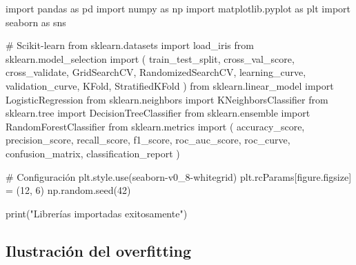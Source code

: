 \documentclass[
  doc,
  floatsintext,
  longtable,
  a4paper,
  nolmodern,
  notxfonts,
  notimes,
  12pt,
  colorlinks=true,linkcolor=blue,citecolor=blue,urlcolor=blue]{apa7}
\newenvironment{Shaded}{\begin{snugshade}}{\end{snugshade}}
\newcommand{\BuiltInTok}[1]{\textcolor[rgb]{0.00,0.23,0.31}{#1}}
\newcommand{\CommentTok}[1]{\textcolor[rgb]{0.37,0.37,0.37}{#1}}
\newcommand{\DecValTok}[1]{\textcolor[rgb]{0.68,0.00,0.00}{#1}}
\newcommand{\ImportTok}[1]{\textcolor[rgb]{0.00,0.46,0.62}{#1}}
\newcommand{\NormalTok}[1]{\textcolor[rgb]{0.00,0.23,0.31}{#1}}
\newcommand{\OperatorTok}[1]{\textcolor[rgb]{0.37,0.37,0.37}{#1}}
\newcommand{\StringTok}[1]{\textcolor[rgb]{0.13,0.47,0.30}{#1}}
\begin{document}
\begin{Shaded}
\begin{Highlighting}[]
\ImportTok{import}\NormalTok{ pandas }\ImportTok{as}\NormalTok{ pd}
\ImportTok{import}\NormalTok{ numpy }\ImportTok{as}\NormalTok{ np}
\ImportTok{import}\NormalTok{ matplotlib.pyplot }\ImportTok{as}\NormalTok{ plt}
\ImportTok{import}\NormalTok{ seaborn }\ImportTok{as}\NormalTok{ sns}

\CommentTok{\# Scikit{-}learn}
\ImportTok{from}\NormalTok{ sklearn.datasets }\ImportTok{import}\NormalTok{ load\_iris}
\ImportTok{from}\NormalTok{ sklearn.model\_selection }\ImportTok{import}\NormalTok{ (}
\NormalTok{    train\_test\_split, cross\_val\_score, cross\_validate,}
\NormalTok{    GridSearchCV, RandomizedSearchCV, learning\_curve,}
\NormalTok{    validation\_curve, KFold, StratifiedKFold}
\NormalTok{)}
\ImportTok{from}\NormalTok{ sklearn.linear\_model }\ImportTok{import}\NormalTok{ LogisticRegression}
\ImportTok{from}\NormalTok{ sklearn.neighbors }\ImportTok{import}\NormalTok{ KNeighborsClassifier}
\ImportTok{from}\NormalTok{ sklearn.tree }\ImportTok{import}\NormalTok{ DecisionTreeClassifier}
\ImportTok{from}\NormalTok{ sklearn.ensemble }\ImportTok{import}\NormalTok{ RandomForestClassifier}
\ImportTok{from}\NormalTok{ sklearn.metrics }\ImportTok{import}\NormalTok{ (}
\NormalTok{    accuracy\_score, precision\_score, recall\_score,}
\NormalTok{    f1\_score, roc\_auc\_score, roc\_curve,}
\NormalTok{    confusion\_matrix, classification\_report}
\NormalTok{)}

\CommentTok{\# Configuración}
\NormalTok{plt.style.use(}\StringTok{\textquotesingle{}seaborn{-}v0\_8{-}whitegrid\textquotesingle{}}\NormalTok{)}
\NormalTok{plt.rcParams[}\StringTok{\textquotesingle{}figure.figsize\textquotesingle{}}\NormalTok{] }\OperatorTok{=}\NormalTok{ (}\DecValTok{12}\NormalTok{, }\DecValTok{6}\NormalTok{)}
\NormalTok{np.random.seed(}\DecValTok{42}\NormalTok{)}

\BuiltInTok{print}\NormalTok{(}\StringTok{"Librerías importadas exitosamente"}\NormalTok{)}
\end{Highlighting}
\end{Shaded}

\subsection{Ilustración del
overfitting}\label{ilustraciuxf3n-del-overfitting}
\end{document}
